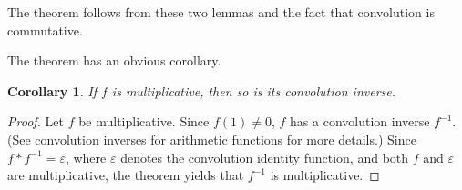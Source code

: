 \documentclass[12pt]{article}
\newtheorem*{cor*}{Corollary}
\begin{document}
The theorem follows from these two lemmas and the fact that convolution is commutative.

The theorem has an obvious corollary.

\begin{cor*}
If $f$ is multiplicative, then so is its convolution inverse.
\end{cor*}

\begin{proof}
Let $f$ be multiplicative.  Since $f(1) \neq 0$, $f$ has a convolution inverse $f^{-1}$.  (See convolution inverses for arithmetic functions for more details.)  Since $f*f^{-1}=\varepsilon$, where $\varepsilon$ denotes the convolution identity function, and both $f$ and $\varepsilon$ are multiplicative, the theorem yields that $f^{-1}$ is multiplicative.
\end{proof}
\end{document}
